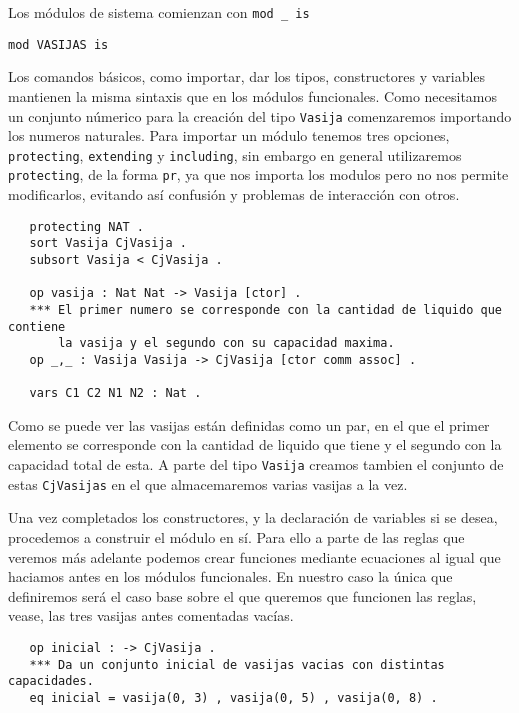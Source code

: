 Los módulos de sistema comienzan con \verb"mod _ is"

{\codesize
\begin{verbatim}
mod VASIJAS is
\end{verbatim}
}

Los comandos básicos, como importar, dar los tipos, constructores y variables mantienen la misma sintaxis que en los módulos funcionales. Como necesitamos un conjunto númerico para la creación del tipo \texttt{Vasija} comenzaremos importando los numeros naturales. Para importar un módulo tenemos tres opciones, \texttt{protecting}, \texttt{extending} y \texttt{including}, sin embargo en general utilizaremos \texttt{protecting}, de la forma \texttt{pr}, ya que nos importa los modulos pero no nos permite modificarlos, evitando así confusión y problemas de interacción con otros. \par

{\codesize
\begin{verbatim}
   protecting NAT .
   sort Vasija CjVasija .
   subsort Vasija < CjVasija .

   op vasija : Nat Nat -> Vasija [ctor] .
   *** El primer numero se corresponde con la cantidad de liquido que contiene 
       la vasija y el segundo con su capacidad maxima.
   op _,_ : Vasija Vasija -> CjVasija [ctor comm assoc] .

   vars C1 C2 N1 N2 : Nat .
\end{verbatim}
}
Como se puede ver las vasijas están definidas como un par, en el que el primer elemento se corresponde con la cantidad de liquido que tiene y el segundo con la capacidad total de esta. A parte del tipo \texttt{Vasija} creamos tambien el conjunto de estas \texttt{CjVasijas} en el que almacemaremos varias vasijas a la vez.\par 

Una vez completados los constructores, y la declaración de variables si se desea, procedemos a construir el módulo en sí. Para ello a parte de las reglas que veremos más adelante podemos crear funciones mediante ecuaciones al igual que haciamos antes en los módulos funcionales. En nuestro caso la única que definiremos será el caso base sobre el que queremos que funcionen las reglas, vease, las tres vasijas antes comentadas vacías.\par

{\codesize
\begin{verbatim}
   op inicial : -> CjVasija .
   *** Da un conjunto inicial de vasijas vacias con distintas capacidades.
   eq inicial = vasija(0, 3) , vasija(0, 5) , vasija(0, 8) .
\end{verbatim}
}

